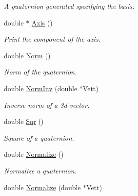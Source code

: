 \begin{DoxyCompactItemize}
\begin{DoxyCompactList}\small\item\em A quaternion generated specifying the basis. \end{DoxyCompactList}\item 
double $\ast$ \hyperlink{classQuadri_ae46739cce135a25e59e90f29fa990d7a}{Axis} ()\hypertarget{classQuadri_ae46739cce135a25e59e90f29fa990d7a}{}\label{classQuadri_ae46739cce135a25e59e90f29fa990d7a}

\begin{DoxyCompactList}\small\item\em Print the component of the axis. \end{DoxyCompactList}\item 
double \hyperlink{classQuadri_ac3486702edb3f0a9835908841db69cfd}{Norm} ()\hypertarget{classQuadri_ac3486702edb3f0a9835908841db69cfd}{}\label{classQuadri_ac3486702edb3f0a9835908841db69cfd}

\begin{DoxyCompactList}\small\item\em Norm of the quaternion. \end{DoxyCompactList}\item 
double \hyperlink{classQuadri_a2f02e2c03155a400cf1f36520d36eec1}{Norm\+Inv} (double $\ast$Vett)\hypertarget{classQuadri_a2f02e2c03155a400cf1f36520d36eec1}{}\label{classQuadri_a2f02e2c03155a400cf1f36520d36eec1}

\begin{DoxyCompactList}\small\item\em Inverse norm of a 3d-\/vector. \end{DoxyCompactList}\item 
double \hyperlink{classQuadri_aab277940763fb3eebc0a598cd86ff232}{Sqr} ()\hypertarget{classQuadri_aab277940763fb3eebc0a598cd86ff232}{}\label{classQuadri_aab277940763fb3eebc0a598cd86ff232}

\begin{DoxyCompactList}\small\item\em Square of a quaternion. \end{DoxyCompactList}\item 
double \hyperlink{classQuadri_aef629c102c4d237ef6e4897238f5bc18}{Normalize} ()\hypertarget{classQuadri_aef629c102c4d237ef6e4897238f5bc18}{}\label{classQuadri_aef629c102c4d237ef6e4897238f5bc18}

\begin{DoxyCompactList}\small\item\em Normalize a quaternion. \end{DoxyCompactList}\item 
double \hyperlink{classQuadri_a8ed7cb1fce0058d8ba75b30e0f07aa44}{Normalize} (double $\ast$Vett)\hypertarget{classQuadri_a8ed7cb1fce0058d8ba75b30e0f07aa44}{}\label{classQuadri_a8ed7cb1fce0058d8ba75b30e0f07aa44}


\end{DoxyCompactItemize}

